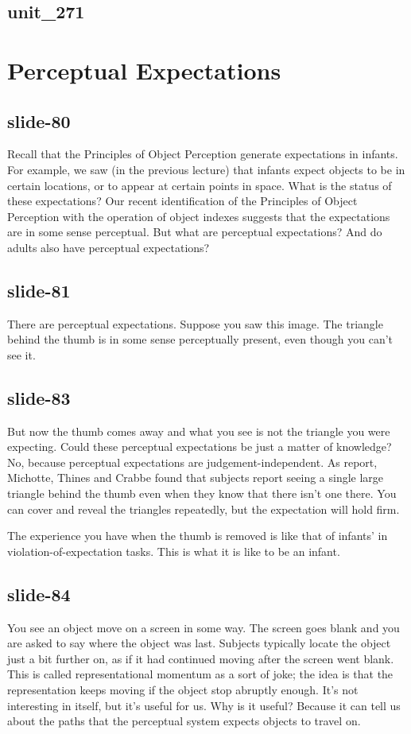 \documentclass[12pt,\papersize]{extarticle}
\begin{document}
 
\subsection{unit\_271}
 
\section{Perceptual Expectations}
 
 
\subsection{slide-80}
Recall that the Principles of Object Perception generate expectations in infants. For example, we saw (in the previous lecture) that infants expect objects to be in certain locations, or to appear at certain points in space.
What is the status of these expectations? Our recent identification of the Principles of Object Perception with the operation of object indexes suggests that the expectations are in some sense perceptual. But what are perceptual expectations? And do adults also have perceptual expectations?
 
 
\subsection{slide-81}
There are perceptual expectations.
Suppose you saw this image.
The triangle behind the thumb is in some sense perceptually present, even though you can't see it.
 
 
\subsection{slide-83}
But now the thumb comes away and what you see is not the triangle you were expecting.
Could these perceptual expectations be just a matter of knowledge?
No, because perceptual expectations are judgement-independent.
As \citep{kellman:1983_perception} report, Michotte, Thines and Crabbe found that subjects report seeing a single large triangle behind the thumb even when they know that there isn't one there.
You can cover and reveal the triangles repeatedly, but the expectation will hold firm.
 
The experience you have when the thumb is removed is like that of infants' in violation-of-expectation tasks.
This is what it is like to be an infant.
 
 
\subsection{slide-84}
You see an object move on a screen in some way.
The screen goes blank and you are asked to say where the object was last.
Subjects typically locate the object just a bit further on, as if it had continued moving after the screen went blank.
This is called representational momentum as a sort of joke; the idea is that the representation keeps moving if the object stop abruptly enough.
It's not interesting in itself, but it's useful for us.
Why is it useful? Because it can tell us about the paths that the perceptual system expects objects to travel on.
 
\end{document}
